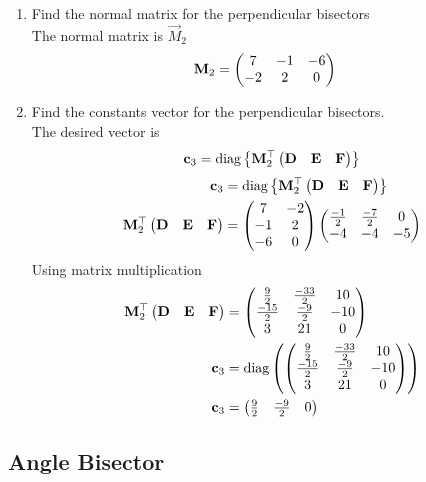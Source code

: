 \documentclass[11pt]{book}
\begin{document}
  
\begin{enumerate}[label=\thesubsection.\arabic*.,ref=\thesubsection.\theenumi]
\item Find the normal matrix for the perpendicular bisectors \\
\solution The normal matrix is $\vec{M}_2$
\begin{align}
       \mathbf{M}_2 &=\begin{pmatrix}7 & -1 & -6 \\ -2 & 2 & 0\end{pmatrix}
\end{align}
\item Find the constants vector for the perpendicular bisectors. \\
\solution The desired vector is 
\begin{align}
\mathbf{c}_3 = \text{diag}\left\{\mathbf{M}_2^{\top}\begin{pmatrix}\mathbf{D} & \mathbf{E} &\mathbf{F}\end{pmatrix}\right\}
\end{align}
\solution
\begin{align}
\mathbf{c}_3 &= \text{diag}\left\{\mathbf{M}_2^{\top}\begin{pmatrix}\mathbf{D} & \mathbf{E} &\mathbf{F}\end{pmatrix}\right\} \\
\mathbf{M}_2^{\top}\begin{pmatrix}\mathbf{D} & \mathbf{E} &\mathbf{F}\end{pmatrix} &= \begin{pmatrix}7&-2 \\ -1&2 \\ -6 &0\end{pmatrix}\begin{pmatrix}\frac{-1}{2} & \frac{-7}{2} & 0 \\ -4 & -4 & -5\end{pmatrix} \\
\end{align}
Using matrix multiplication
\begin{align}
 \mathbf{M}_2^{\top}\begin{pmatrix}\mathbf{D} & \mathbf{E} &\mathbf{F}\end{pmatrix} &=\begin{pmatrix} \frac{9}{2} & \frac{-33}{2} & 10 \\ \frac{-15}{2} & \frac{-9}{2} & -10 \\ 3 & 21 & 0 \end{pmatrix} \\
    \mathbf{c}_3 &= \text{diag}\left( \begin{pmatrix} \frac{9}{2} & \frac{-33}{2} & 10 \\ \frac{-15}{2} & \frac{-9}{2} & -10 \\ 3 & 21 & 0 \end{pmatrix} \right) \\
 \mathbf{c}_3   &= \begin{pmatrix} \frac{9}{2} & \frac{-9}{2} & 0\end{pmatrix}
\end{align}

\end{enumerate}


\subsection{Angle Bisector}
\end{document}
